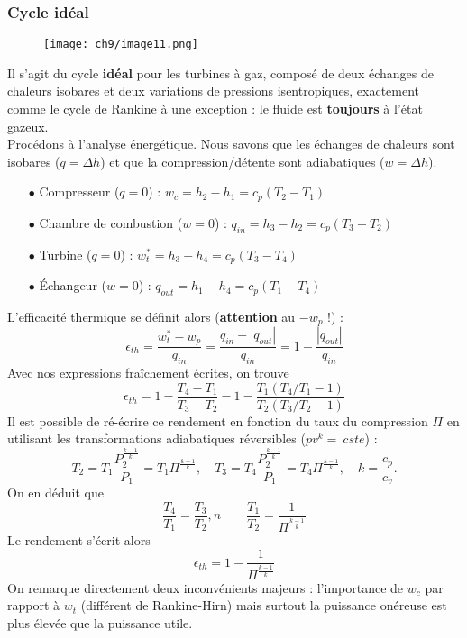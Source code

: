 		\subsubsection{Cycle idéal}
		\begin{wrapfigure}[11]{l}{10cm}
		\vspace{-5mm}
	\texttt{[image: ch9/image11.png]}
		\end{wrapfigure}			
	Il s'agit du cycle \textbf{idéal} pour les turbines à gaz, composé de deux échanges 
	de chaleurs isobares et deux variations de pressions isentropiques, exactement comme 
	le cycle de Rankine à une exception : le fluide est \textbf{toujours} à l'état 
	gazeux.\\
	
	Procédons à l'analyse énergétique. Nous savons que les échanges de chaleurs sont 
	isobares ($q = \Delta h$) et que la compression/détente sont adiabatiques ($w=\Delta h$).
	
	\begin{itemize}
	\item[$\bullet$] Compresseur ($q=0$) : $w_c = h_2-h_1 = c_p(T_2-T_1)$
	\item[$\bullet$] Chambre de combustion ($w=0$) : $q_{in} = h_3-h_2 = c_p(T_3-T_2)$
	\item[$\bullet$] Turbine ($q=0$) : $w^*_t = h_3-h_4 = c_p(T_3-T_4)$
	\item[$\bullet$] Échangeur ($w=0$) : $q_{out} = h_1-h_4 = c_p(T_1-T_4)$
	\end{itemize}
	L'efficacité thermique se définit alors (\textbf{attention} au $-w_p$ !) :
	\begin{equation}
	\epsilon_{th} = \dfrac{w_t^*-w_p}{q_{in}} = \dfrac{q_{in}-|q_{out}|}{q_{in}} = 1-
	\dfrac{|q_{out}|}{q_{in}}
	\end{equation}
	Avec nos expressions fraîchement écrites, on trouve
	\begin{equation}
	\epsilon_{th} = 1-\dfrac{T_4-T_1}{T_3-T_2} - 1-\dfrac{T_1(T_4/T_1-1)}{T_2(T_3/T_2-1)}
	\end{equation}
	Il est possible de ré-écrire ce rendement en fonction du taux du compression $\Pi$ en 
	utilisant les transformations adiabatiques réversibles ($pv^k =\ cste$) :
	\begin{equation}
	T_2 = T_1 \dfrac{P_2^{\frac{k-1}{k}}}{P_1} = T_1\Pi^{\frac{k-1}{k}}, \quad 
	T_3 = T_4 \dfrac{P_2^{\frac{k-1}{k}}}{P_1} = T_4\Pi^{\frac{k-1}{k}}, \quad k = \dfrac{c_p}{
	c_v}.
	\end{equation}
	On en déduit que
	\begin{equation}
	\dfrac{T_4}{T_1}=\dfrac{T_3}{T_2},n \qquad \dfrac{T_1}{T_2} = \dfrac{1}{\Pi^{\frac{k-1}{k}}}
	\end{equation}
	Le rendement s'écrit alors 
	\begin{equation}
	\epsilon_{th} = 1- \dfrac{1}{\Pi^{\frac{k-1}{k}}}
	\end{equation}
	On remarque directement deux inconvénients majeurs : l'importance de $w_c$ par rapport 
	à $w_t$ (différent de Rankine-Hirn) mais surtout la puissance onéreuse est plus élevée 
	que la puissance utile.
	
